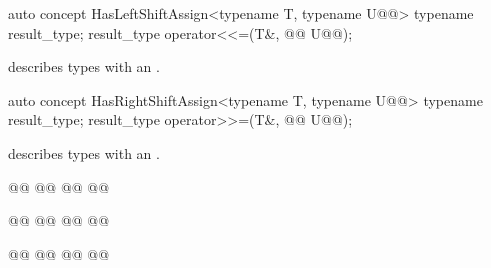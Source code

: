 \documentclass[american,twoside]{book}
\begin{document}
\begin{itemdecl}
auto concept HasLeftShiftAssign<typename T, typename U@@> {
  typename result_type;
  result_type operator<<=(T&, @@ U@\removedCCC{\&}@);
}
\end{itemdecl}

\begin{itemdescr}
\pnum
\mbox{\reallynote} describes types with an \mbox{}.
\end{itemdescr}

\begin{itemdecl}
auto concept HasRightShiftAssign<typename T, typename U@@> {
  typename result_type;
  result_type operator>>=(T&, @@ U@\removedCCC{\&}@);
}
\end{itemdecl}

\begin{itemdescr}
\pnum
\mbox{\reallynote} describes types with an \mbox{}.
\end{itemdescr}

\begin{itemdecl}
@@
  @@
  @@
@\addedCC{\}}@
\end{itemdecl}

\begin{itemdescr}
\pnum
{}
\end{itemdescr}

\begin{itemdecl}
@@
  @@
  @@
@\addedCC{\}}@
\end{itemdecl}

\begin{itemdescr}
\pnum
{}
\end{itemdescr}

\begin{itemdecl}
@@
  @@
  @@
@\addedCC{\}}@
\end{itemdecl}

\begin{itemdescr}
\pnum
{}
\end{itemdescr}
\end{document}
